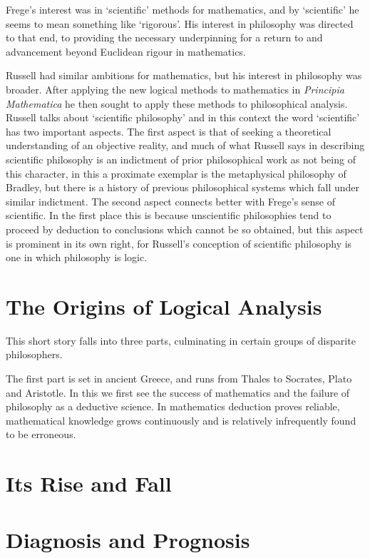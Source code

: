 Frege's interest was in `scientific' methods for mathematics, and by `scientific' he seems to mean something like `rigorous'.
His interest in philosophy was directed to that end, to providing the necessary underpinning for a return to and advancement beyond Euclidean rigour in mathematics.

Russell had similar ambitions for mathematics, but his interest in philosophy was broader.
After applying the new logical methods to mathematics in \emph{Principia Mathematica}\cite{russell10} he then sought to apply these methods to philosophical analysis.
Russell talks about `scientific philosophy' and in this context the word `scientific' has two important aspects.
The first aspect is that of seeking a theoretical understanding of an objective reality, and much of what Russell says in describing scientific philosophy is an indictment of prior philosophical work as not being of this character, in this a proximate exemplar is the metaphysical philosophy of Bradley, but there is a history of previous philosophical systems which fall under similar indictment.
The second aspect connects better with Frege's sense of scientific.
In the first place this is because unscientific philosophies tend to proceed by deduction to conclusions which cannot be so obtained, but this aspect is prominent in its own right, for Russell's conception of scientific philosophy is one in which philosophy is logic.
\cite{russellPF,russellPLA,russell1921,russellML,russellSMP}

\section{The Origins of Logical Analysis}

This short story falls into three parts, culminating in certain groups of disparite philosophers.

The first part is set in ancient Greece, and runs from Thales to Socrates, Plato and Aristotle.
In this we first see the success of mathematics and the failure of philosophy as a deductive science.
In mathematics deduction proves reliable, mathematical knowledge grows continuously and is relatively infrequently found to be erroneous.



\section{Its Rise and Fall}

\section{Diagnosis and Prognosis}

